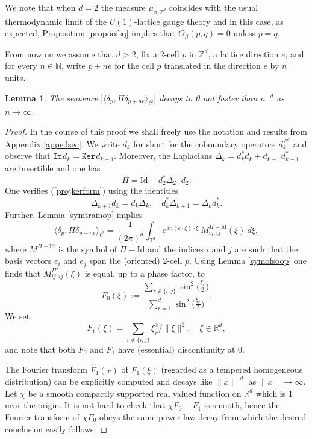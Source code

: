 \documentclass[11pt,reqno]{amsart}
\numberwithin{equation}{section}
\newtheorem{lemma}[theorem]{Lemma}
\theoremstyle{remark}
\theoremstyle{rmdefinition}
\begin{document}
We note that when $d=2$ the measure $\mu_{\beta, \mathbb{Z}^d}$ coincides with the usual thermodynamic limit of the $U(1)$-lattice gauge theory and in this case, as expected, Proposition \ref{propoofsq} implies that $ O_{\beta}(p,q)=0$ unless $p=q$.

From now on we assume that $d>2$, fix a 2-cell $p$ in $\mathbb{Z}^d$, a lattice direction $e$, and for every $n \in \mathbb{N}$, write $p+ne$ for the cell $p$ translated in the direction $e$ by $n$ units.

\begin{lemma}\label{decaylemm} The sequence $|\langle  \delta_p,\Pi \delta_{p+ne} \rangle_{\ell^2}|$ decays to 0 not faster than $n^{-d}$ as $n \to \infty$.
\end{lemma}
\begin{proof} In the course of this proof we shall freely use the notation and results from Appendix \ref{appedsec}. We write $d_k$ for short for the coboundary operators $d_k^{\hspace{1pt}\mathbb{Z}^d}$ and observe that $\overline{\mathtt{Im} \hspace{1pt} d_k}=\mathtt{Ker} \hspace{1pt} d_{k+1}$. Moreover, the Laplacians $\Delta_k=d_k^{*} d_k + d_{k-1} d^*_{k-1}$ are invertible and one has 
\begin{equation}\label{projkerform}
	\Pi = \text{Id} - d_2^{*} \Delta^{-1}_2 d_2.
\end{equation}
One verifies (\ref{projkerform}) using the identities 
$$  \Delta_{k+1} d_k= d_k\Delta_k, \quad d^*_k\Delta_{k+1}=\Delta_kd^*_k .$$
Further, Lemma \ref{symtrainop} implies
\begin{equation}
\langle  \delta_p,\Pi \delta_{p+ne} \rangle_{\ell^2}=
\frac{1}{(2\pi)^d}\int_{\mathbb{T}^d} e^{\,in (e \cdot \xi)\cdot \xi}\ M^{\Pi-\text{Id}}_{ij,ij}(\xi)\ d\xi,
\end{equation}
where $M^{\Pi-\text{Id}}$ is the symbol of $\Pi-\text{Id}$ and the indices $i$ and $j$ are such that the basis vectors $e_i$ and $e_j$ span the (oriented) 2-cell $p$. Using Lemma \ref{symofsoop} one finds that $M^{\Pi'}_{ij,ij}(\xi)$ is equal, up to a phase factor, to 
$$F_0(\xi):=\frac{\displaystyle\sum_{r\notin\{i,j\}}\sin^2\!\big(\tfrac{\xi_r}{2}\big)}{\displaystyle \sum_{r=1}^d \sin^2\!\big(\tfrac{\xi_r}{2}\big)}  .$$
We set
$$F_1(\xi)= \sum_{r\notin\{i,j\}}\xi_r^2/\|\xi\|^2, \quad \xi \in \mathbb{R}^d,$$
and note that both $F_0$ and $F_1$ have (essential) discontinuity at 0. 

The Fourier transform $\hat{F}_1(x)$ of $F_1(\xi)$ (regarded as a tempered homogeneous distribution) can be explicitly computed and decays like $\|x\|^{-d}$ as $\|x\| \to \infty$. Let $\chi$ be a smooth compactly supported real valued function on $\mathbb{R}^d$ which is 1 near the origin. It is not hard to check that $\chi F_0-F_1$ is smooth, hence the Fourier transform of $\chi F_0$ obeys the same power law decay from which the desired conclusion easily follows.
\end{proof}
\end{document}
